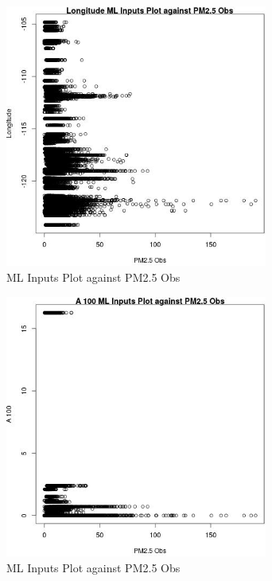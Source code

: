 \begin{figure} 
\centering  
\includegraphics[width=0.77\textwidth]{Code_Outputs/Report_ML_input_PM25_Step4_part_e_de_duplicated_aves_LongitudevPM25_Obs.jpg} 
\caption{\label{fig:Report_ML_input_PM25_Step4_part_e_de_duplicated_avesLongitudevPM25_Obs}ML Inputs Plot against PM2.5 Obs} 
\end{figure} 
 

\begin{figure} 
\centering  
\includegraphics[width=0.77\textwidth]{Code_Outputs/Report_ML_input_PM25_Step4_part_e_de_duplicated_aves_A_100vPM25_Obs.jpg} 
\caption{\label{fig:Report_ML_input_PM25_Step4_part_e_de_duplicated_avesA_100vPM25_Obs}ML Inputs Plot against PM2.5 Obs} 
\end{figure} 
 

